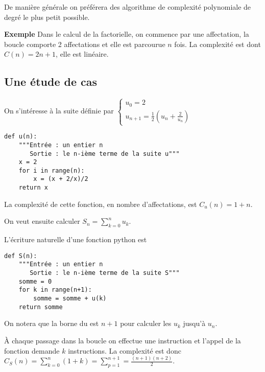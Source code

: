 De manière générale on préférera des algorithme de complexité polynomiale de degré le plus petit possible.

\medskip

{\bf Exemple} Dans le calcul de la factorielle, on commence par une affectation, la boucle comporte 2 affectations et elle est parcourue $n$ fois. La complexité est dont $C(n)=2n+1$, elle est linéaire.
\subsection{Une étude de cas}
On s'intéresse à la suite définie par 
$\displaystyle \left\{ \begin{matrix} u_0 = 2\\
u_{n+1} = \frac 12\left(u_n + \frac 2{u_n}\right)
\end{matrix}\right.$

\medskip
\begin{lstlisting}
def u(n):
    """Entrée : un entier n
       Sortie : le n-ième terme de la suite u"""
    x = 2
    for i in range(n):
        x = (x + 2/x)/2
    return x
\end{lstlisting}

La complexité de cette fonction, en nombre d'affectations, est $C_u(n)=1 + n$.

On veut ensuite calculer $\displaystyle S_n = \sum_{k=0}^n u_k$.

\medskip{}

L'écriture naturelle d'une fonction python est
\begin{lstlisting}
def S(n):
    """Entrée : un entier n
       Sortie : le n-ième terme de la suite S"""
    somme = 0
    for k in range(n+1):
        somme = somme + u(k)
    return somme
\end{lstlisting}
On notera que la borne du  est $n+1$ pour calculer les $u_k$ jusqu'à $u_n$.

À chaque passage dans la boucle on effectue une instruction et l'appel de la fonction  demande $k$ instructions. La complexité est donc $\displaystyle C_S(n) = \sum_{k=0}^n (1 + k) = \sum_{p=1}^{n+1} = \frac{(n+1)(n+2)}2$. 

